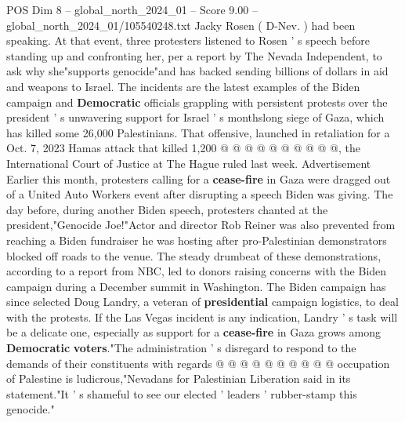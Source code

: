 \begin{textsample}{POS Dim 8 – global\_north\_2024\_01 – Score 9.00 – global\_north\_2024\_01/105540248.txt}
Jacky Rosen ( D-Nev. ) had been speaking.
At that event, three protesters listened to Rosen ' s speech before standing up and confronting her, per a report by The Nevada Independent, to ask why she"supports genocide"and has backed sending billions of dollars in aid and weapons to Israel.
The incidents are the latest examples of the Biden campaign and \textbf{Democratic} officials grappling with persistent protests over the president ' s unwavering support for Israel ' s monthslong siege of Gaza, which has killed some 26,000 Palestinians.
That offensive, launched in retaliation for a Oct. 7, 2023 Hamas attack that killed 1,200 @ @ @ @ @ @ @ @ @ @, the International Court of Justice at The Hague ruled last week.
Advertisement Earlier this month, protesters calling for a \textbf{cease-fire} in Gaza were dragged out of a United Auto Workers event after disrupting a speech Biden was giving.
The day before, during another Biden speech, protesters chanted at the president,"Genocide Joe!"Actor and director Rob Reiner was also prevented from reaching a Biden fundraiser he was hosting after pro-Palestinian demonstrators blocked off roads to the venue.
The steady drumbeat of these demonstrations, according to a report from NBC, led to donors raising concerns with the Biden campaign during a December summit in Washington.
The Biden campaign has since selected Doug Landry, a veteran of \textbf{presidential} campaign logistics, to deal with the protests.
If the Las Vegas incident is any indication, Landry ' s task will be a delicate one, especially as support for a \textbf{cease-fire} in Gaza grows among \textbf{Democratic} \textbf{voters}."The administration ' s disregard to respond to the demands of their constituents with regards @ @ @ @ @ @ @ @ @ @ occupation of Palestine is ludicrous,"Nevadans for Palestinian Liberation said in its statement."It ' s shameful to see our elected ' leaders ' rubber-stamp this genocide."

\end{textsample}
